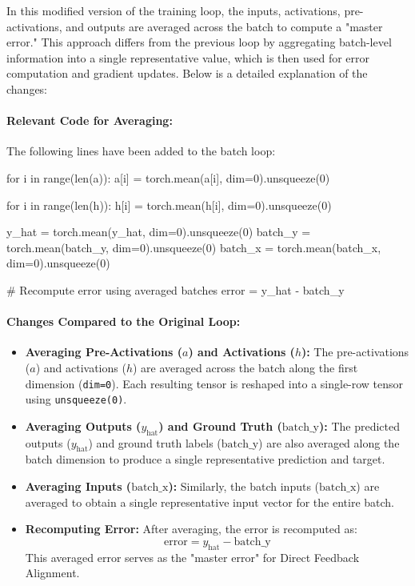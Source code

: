 \documentclass[english]{article}
\begin{document}
In this modified version of the training loop, the inputs, activations, pre-activations, and outputs are averaged across the batch to compute a "master error." This approach differs from the previous loop by aggregating batch-level information into a single representative value, which is then used for error computation and gradient updates. Below is a detailed explanation of the changes:

\paragraph{Relevant Code for Averaging:}
The following lines have been added to the batch loop:
\begin{python}
for i in range(len(a)):
    a[i] = torch.mean(a[i], dim=0).unsqueeze(0)

for i in range(len(h)):
    h[i] = torch.mean(h[i], dim=0).unsqueeze(0)

y_hat = torch.mean(y_hat, dim=0).unsqueeze(0)
batch_y = torch.mean(batch_y, dim=0).unsqueeze(0)
batch_x = torch.mean(batch_x, dim=0).unsqueeze(0)

# Recompute error using averaged batches
error = y_hat - batch_y
\end{python}

\paragraph{Changes Compared to the Original Loop:}
\begin{itemize}
    \item \textbf{Averaging Pre-Activations (\(a\)) and Activations (\(h\)):}
    The pre-activations (\(a\)) and activations (\(h\)) are averaged across the batch along the first dimension (\texttt{dim=0}). Each resulting tensor is reshaped into a single-row tensor using \texttt{unsqueeze(0)}.

    \item \textbf{Averaging Outputs (\(y_{\text{hat}}\)) and Ground Truth (\(\text{batch\_y}\)):}
    The predicted outputs (\(y_{\text{hat}}\)) and ground truth labels (\(\text{batch\_y}\)) are also averaged along the batch dimension to produce a single representative prediction and target.

    \item \textbf{Averaging Inputs (\(\text{batch\_x}\)):}
    Similarly, the batch inputs (\(\text{batch\_x}\)) are averaged to obtain a single representative input vector for the entire batch.

    \item \textbf{Recomputing Error:}
    After averaging, the error is recomputed as:
    \[
    \text{error} = y_{\text{hat}} - \text{batch\_y}
    \]
    This averaged error serves as the "master error" for Direct Feedback Alignment.

\end{itemize}
\end{document}
